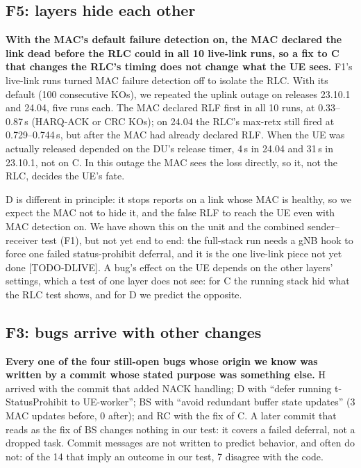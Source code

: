 \documentclass[sigconf,10pt]{acmart}
\newcommand{\sw}[1]{\textsf{\small #1}}
\begin{document}
\subsection{F5: layers hide each other}

\textbf{With the MAC's default failure detection on, the MAC declared the
link dead before the RLC could in all 10 live-link runs, so a fix to
\sw{C} that changes the RLC's timing does not change what the UE sees.}
F1's live-link runs turned MAC failure detection off to isolate the RLC.
With its default (100 consecutive KOs), we repeated the uplink outage on
releases 23.10.1 and 24.04, five runs each. The MAC declared RLF first in
all 10 runs, at 0.33--0.87\,s (HARQ-ACK or CRC KOs); on 24.04 the RLC's
max-retx still fired at 0.729--0.744\,s, but after the MAC had already
declared RLF. When the UE was actually released depended on the DU's
release timer, 4\,s in 24.04 and 31\,s in 23.10.1, not on \sw{C}. In this
outage the MAC sees the loss directly, so it, not the RLC, decides the
UE's fate.

\sw{D} is different in principle: it stops reports on a link whose MAC is
healthy, so we expect the MAC not to hide it, and the false RLF to reach
the UE even with MAC detection on. We have shown this on the unit and the
combined sender--receiver test (F1), but not yet end to end: the
full-stack run needs a gNB hook to force one failed status-prohibit
deferral, and it is the one live-link piece not yet done
[TODO-DLIVE]. A bug's effect on the UE depends on the other layers'
settings, which a test of one layer does not see: for \sw{C} the running
stack hid what the RLC test shows, and for \sw{D} we predict the
opposite.

\subsection{F3: bugs arrive with other changes}

\textbf{Every one of the four still-open bugs whose origin we know was
written by a commit whose stated purpose was something else.}
\sw{H} arrived with the commit that added NACK handling; \sw{D} with
``defer running t-StatusProhibit to UE-worker''; \sw{BS} with ``avoid
redundant buffer state updates'' (3 MAC updates before, 0 after); and
\sw{RC} with the fix of \sw{C}. A later commit that reads as the fix of
\sw{BS} changes nothing in our test: it covers a failed deferral, not a
dropped task. Commit messages are not written to predict behavior, and
often do not: of the 14 that imply an outcome in our test, 7 disagree
with the code.
\end{document}
